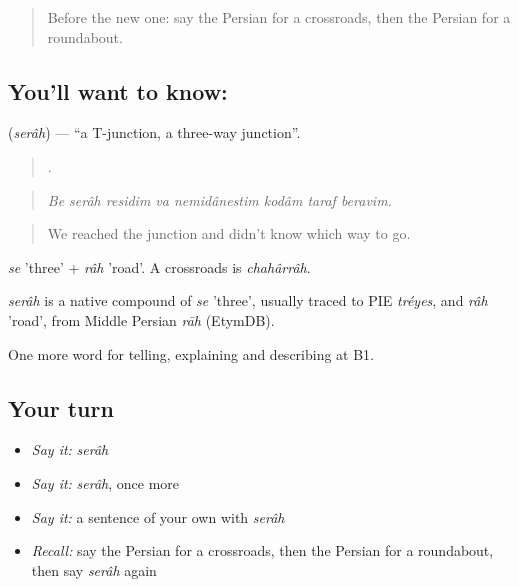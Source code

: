 \label{lesson:FA-C445-serah}



\begin{quote}
Before the new one: say the Persian for a crossroads, then the Persian for a roundabout.
\end{quote}

\subsection*{You'll want to know:  }
\textbf{ } (\emph{serâh}) — \textquotedblleft{}a T-junction, a three-way junction\textquotedblright{}.

\begin{quote}
        .
\end{quote}

\begin{quote}
\emph{Be serâh residim va nemidânestim kodâm taraf beravim.}
\end{quote}

\begin{quote}
We reached the junction and didn't know which way to go.
\end{quote}

\emph{se} 'three' + \emph{râh} 'road'. A crossroads is \emph{chahârrâh}.

\begin{cousinweb}
\emph{serâh} is a native compound of \emph{se} 'three', usually traced to PIE \emph{tréyes}, and \emph{râh} 'road', from Middle Persian \emph{rāh} (EtymDB).
\end{cousinweb}

\begin{grammarlens}[title={What you've built}]
One more word for telling, explaining and describing at B1.
\end{grammarlens}

\subsection*{Your turn}
\begin{itemize}
\raggedright
  \item \emph{Say it:} \emph{serâh}
  \item \emph{Say it:} \emph{serâh}, once more
  \item \emph{Say it:} a sentence of your own with \emph{serâh}
  \item \emph{Recall:} say the Persian for a crossroads, then the Persian for a roundabout, then say \emph{serâh} again
\end{itemize}

